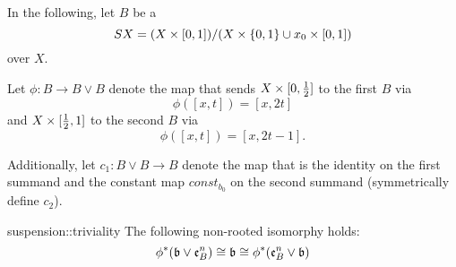 \begin{myparagraph}
    In the following, let $B$ be a 
    \[ SX = (X \times{} [0, 1]) / (X \times \{0, 1\} \cup x_0 \times{} [0, 1])\]
    over $X$.

    Let $\phi: B \to B \vee B$ denote the map that sends
    $X \times [0, \frac{1}{2}]$ to the first $B$ via
    \[ \phi([x, t]) = [x, 2t] \]
    and $X \times [\frac{1}{2}, 1]$ to the second $B$ via
    \[ \phi([x, t]) = [x, 2t - 1]. \]

    Additionally, let $c_1: B \vee B \to B$ denote the map
    that is the identity on the first summand
    and the constant map $const_{b_0}$ on the second summand (symmetrically define $c_2$).
\end{myparagraph}

\begin{mylemma}{suspension::triviality}
    The following non-rooted isomorphy holds:
    \[ \phi^*(\mathfrak{b} \vee \mathfrak{e}^{n}_B) \cong \mathfrak{b} \cong \phi^*(\mathfrak{e}^{n}_B \vee \mathfrak{b}) \]
\end{mylemma}
